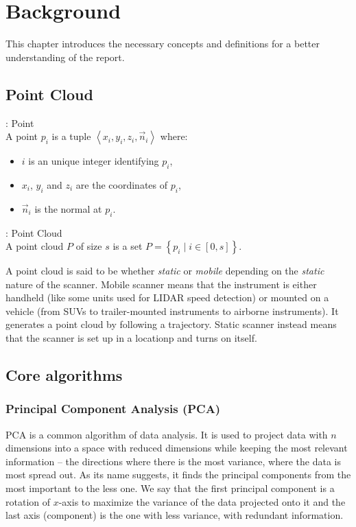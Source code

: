 \chapter{Background}
\label{ch:background}
This chapter introduces the necessary concepts and definitions for a better understanding of the report.

\section{Point Cloud}
\begin{definition}{: Point}
  \\A point $p_i$ is a tuple $\left\langle x_i, y_i, z_i, \vec{n}_i \right\rangle$ where:
  \begin{itemize}
    \item $i$ is an unique integer identifying $p_i$,
    \item $x_i$, $y_i$ and $z_i$ are the coordinates of $p_i$,
    \item $\vec{n}_i$ is the normal at $p_i$.
  \end{itemize}
\end{definition}

\begin{definition}{: Point Cloud}
  \\A point cloud $P$ of size $s$ is a set $P = \left\lbrace p_i \mid i \in [0, s]  \right\rbrace$.
\end{definition}

A point cloud is said to be whether \emph{static} or \emph{mobile} depending on the \emph{static} nature of the scanner. Mobile scanner means that the instrument is either handheld (like some units used for LIDAR speed detection) or mounted on a vehicle (from SUVs to trailer-mounted instruments to airborne instruments). It generates a point cloud by following a trajectory. Static scanner instead means that the scanner is set up in a locationp and turns on itself.


\section{Core algorithms}

\subsection{Principal Component Analysis (PCA)}
\label{subsc:pca}
PCA is a common algorithm of data analysis. It is used to project data with $n$ dimensions into a space with reduced dimensions while keeping the most relevant information -- the directions where there is the most variance, where the data is most spread out. As its name suggests, it finds the principal components from the most important to the less one. We say that the first principal component is a rotation of $x$-axis to maximize the variance of the data projected onto it and the last axis (component) is the one with less variance, with redundant information.

